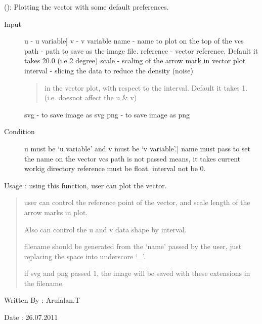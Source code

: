 \documentclass[letterpaper,10pt,english]{sphinxmanual}
\begin{document}
\begin{fulllineitems}
\label{diagnosisutils:plot.vectorPlot}
{\hyperref[diagnosisutils:plot.vectorPlot]{}} (): Plotting the vector with some default preferences.
\begin{description}
\item[{Input}] \leavevmode{[}u - u variable{]}
v - v variable
name - name to plot on the top of the vcs
path - path to save as the image file.
reference - vector reference. Default it takes 20.0 (i.e 2 degree)
scale - scaling of the arrow mark in vector plot
interval - slicing the data to reduce the density (noise)
\begin{quote}

in the vector plot, with respect to the interval.
Default it takes 1. (i.e. doesnot affect the u \& v)
\end{quote}

svg - to save image as svg
png - to save image as png

\item[{Condition}] \leavevmode{[}u must be `u variable' and v must be `v variable'.{]}
name must pass to set the name on the vector vcs
path is not passed means, it takes current workig directory
reference must be float.
interval not be 0.

\end{description}

Usage : using this function, user can plot the vector.
\begin{quote}

user can control the reference point of the vector, and scale
length of the arrow marks in plot.

Also can control the u and v data shape by interval.

filename should be generated from the `name' passed by the user,
just replacing the space into underscore `\_'.

if svg and png passed 1, the image will be saved with these
extensions in the filename.
\end{quote}

Written By : Arulalan.T

Date : 26.07.2011

\end{fulllineitems}
\end{document}
